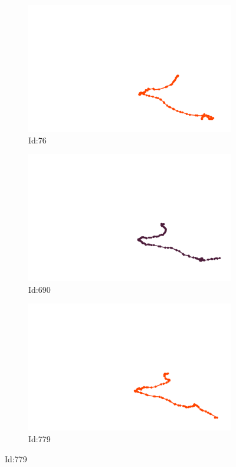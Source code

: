\documentclass[12pt,twoside]{report}
\begin{document}
\begin{figure}
\centering
\begin{subfigure}[b]{0.20\textwidth}
\centering
\includegraphics[width=\textwidth]{../../trajectories/76.png}
\caption{Id:76}
\end{subfigure}
\begin{subfigure}[b]{0.20\textwidth}
\centering
\includegraphics[width=\textwidth]{../../trajectories/690.png}
\caption{Id:690}
\end{subfigure}
\begin{subfigure}[b]{0.20\textwidth}
\centering
\includegraphics[width=\textwidth]{../../trajectories/779.png}
\caption{Id:779}
\end{subfigure}
\end{figure}
\end{document}
